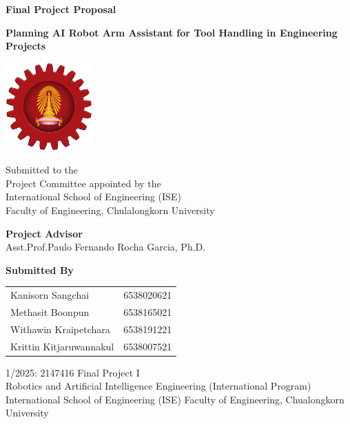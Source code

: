 \documentclass[12pt]{extarticle}
\begin{document}
\begin{titlepage}
    \centering
    {\Large \textbf{Final Project Proposal}\par}
    \vspace{1cm}
        
    {\Large \textbf{Planning AI Robot Arm Assistant for Tool Handling in Engineering Projects}\par}
    \vspace{1cm}
    
    \includegraphics[width=0.25\textwidth]{cu_eng}\par\vspace{1cm}

    Submitted to the\\
    Project Committee appointed by the\\
    International School of Engineering (ISE)\\
    Faculty of Engineering, Chulalongkorn University
    \vspace{1cm}
    
    {\large \textbf{Project Advisor}} \\
    Asst.Prof.Paulo Fernando Rocha Garcia, Ph.D.
    \vspace{1cm}
    
    {\large \textbf{Submitted By}} \\
    \begin{tabular}{l l}
    Kanisorn Sangchai   & 6538020621 \\
    Methasit Boonpun    & 6538165021 \\
    Withawin Kraipetchara & 6538191221 \\
    Krittin Kitjaruwannakul & 6538007521 \\
    \end{tabular}
    \vspace{1cm}
    
    1/2025: 2147416 Final Project I\\
Robotics and Artificial Intelligence Engineering (International Program)\\
International School of Engineering (ISE) Faculty of Engineering, Chualongkorn University

\end{titlepage}
\end{document}
